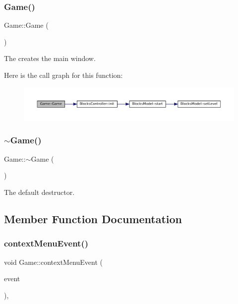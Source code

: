 \subsubsection{\texorpdfstring{Game()}{Game()}}
{\footnotesize\ttfamily Game\+::\+Game (\begin{DoxyParamCaption}{ }\end{DoxyParamCaption})\hspace{0.3cm}{\ttfamily [explicit]}}



The creates the main window. 

Here is the call graph for this function\+:
\nopagebreak
\begin{figure}[H]
\begin{center}
\leavevmode
\includegraphics[width=350pt]{class_game_ad59df6562a58a614fda24622d3715b65_cgraph}
\end{center}
\end{figure}
\mbox{\label{class_game_ae3d112ca6e0e55150d2fdbc704474530}} 
\subsubsection{\texorpdfstring{$\sim$Game()}{~Game()}}
{\footnotesize\ttfamily Game\+::$\sim$\+Game (\begin{DoxyParamCaption}{ }\end{DoxyParamCaption})\hspace{0.3cm}{\ttfamily [virtual]}}



The default destructor. 



\subsection{Member Function Documentation}
\mbox{\label{class_game_a4122fd61c61ca57ecbe4458f938e2f98}} 
\subsubsection{\texorpdfstring{contextMenuEvent()}{contextMenuEvent()}}
{\footnotesize\ttfamily void Game\+::context\+Menu\+Event (\begin{DoxyParamCaption}\item[{Q\+Context\+Menu\+Event $\ast$}]{event }\end{DoxyParamCaption})\hspace{0.3cm}{\ttfamily [override]}, {\ttfamily [protected]}}



